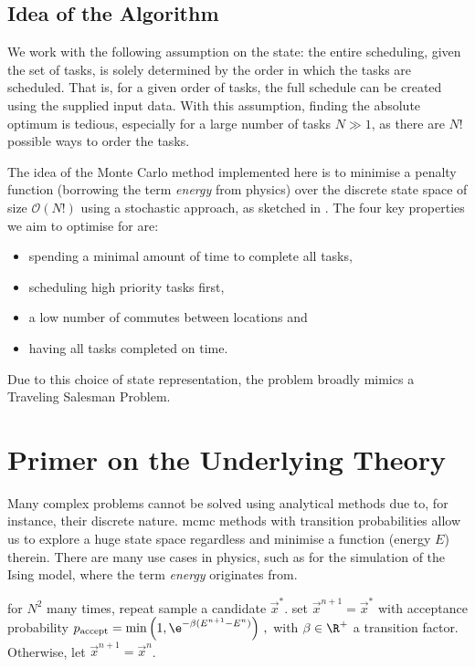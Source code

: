 \documentclass{prettytex/ox/mmsc-special-topic}
\begin{document}
  \subsection{Idea of the Algorithm}
  We work with the following assumption on the state: the entire scheduling, given the set of tasks, is solely determined by the order in which the tasks are scheduled.
  That is, for a given order of tasks, the full schedule can be created using the supplied input data.
  With this assumption, finding the absolute optimum is tedious, especially for a large number of tasks $N \gg 1$, as there are $N!$ possible ways to order the tasks.

  The idea of the Monte Carlo method implemented here is to minimise a penalty function (borrowing the term \textit{energy} from physics) over the discrete state space of size $\mathcal{O}(N!)$ using a stochastic approach, as sketched in .
  The four key properties we aim to optimise for are:
  \begin{itemize}
    \tightlist
    \item spending a minimal amount of time to complete all tasks,
    \item scheduling high priority tasks first,
    \item a low number of commutes between locations and
    \item having all tasks completed on time.
  \end{itemize}
  Due to this choice of state representation, the problem broadly mimics a Traveling Salesman Problem.

  \section{Primer on the Underlying Theory}
  Many complex problems cannot be solved using analytical methods due to, for instance, their discrete nature.
  \gls{mcmc} methods with transition probabilities allow us to explore a huge state space regardless and minimise a function (energy $E$) therein.
  There are many use cases in physics, such as for the simulation of the Ising model, where the term \textit{energy} originates from.

  \label{sec:theory}
  \begin{algorithm}[language=pseudo,caption={\centering The Metropolis-Hastings sweep() sub-routine \parencite{metropolis, hastings}},basicstyle=\footnotesize]
for $N^2$ many times, repeat
  sample a candidate $\vec{x}^*$.
  set $\vec{x}^{n+1} = \vec{x}^*$ with acceptance probability
    $p_{\rm accept} = \min\left(1, \e^{-\beta (E^{n+1} - E^n)}\right)\,,$ with $\beta \in \R^+$ a transition factor.
  Otherwise, let $\vec{x}^{n+1} = \vec{x}^{n}$.
  \end{algorithm}
\end{document}
